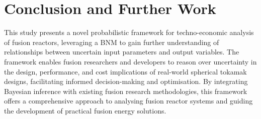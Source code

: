 \documentclass[journal]{IEEEtran}
\begin{document}




\section{Conclusion and Further Work}\label{sec:conc}

This study presents a novel probabilistic framework for techno-economic analysis of fusion reactors, leveraging a BNM to gain further understanding of relationships between uncertain input parameters and output variables. The framework enables fusion researchers and developers to reason over uncertainty in the design, performance, and cost implications of real-world spherical tokamak designs, facilitating informed decision-making and optimisation. By integrating Bayesian inference with existing fusion research methodologies, this framework offers a comprehensive approach to analysing fusion reactor systems and guiding the development of practical fusion energy solutions. 
\end{document}
